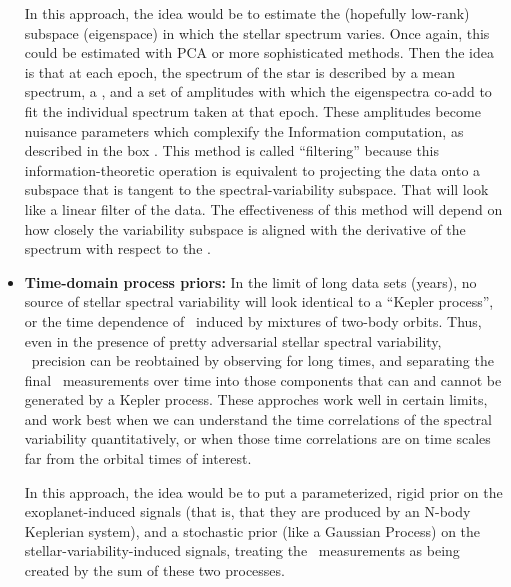 \documentclass[12pt, letterpaper]{article}
\begin{document}
\begin{itemize}
In this approach, the idea would be to estimate the (hopefully
low-rank) subspace (eigenspace) in which the stellar spectrum varies.
Once again, this could be estimated with PCA or more sophisticated
methods.
Then the idea is that at each epoch, the spectrum of the star is
described by a mean spectrum, a \RV, and a set of amplitudes with
which the eigenspectra co-add to fit the individual spectrum taken at
that epoch.
These amplitudes become nuisance parameters which complexify the
Information computation, as described in the box .
This method is called ``filtering'' because this information-theoretic
operation is equivalent to projecting the data onto a subspace that is
tangent to the spectral-variability subspace.
That will look like a linear filter of the data. 
The effectiveness of this method will depend on how closely the variability
subspace is aligned with the derivative of the spectrum with respect to the \RV. 
\item
\textbf{Time-domain process priors:}
In the limit of long data sets (years), no source of stellar spectral
variability will look identical to a ``Kepler process'', or the time
dependence of \RV\ induced by mixtures of two-body orbits.
Thus, even in the presence of pretty adversarial stellar spectral
variability, \EPRV\ precision can be reobtained by observing for long
times, and separating the final \RV\ measurements over time into those
components that can and cannot be generated by a Kepler process.
These approches work well in certain limits, and work best when we can
understand the time correlations of the spectral variability quantitatively,
or when those time correlations are on time scales far from the
orbital times of interest.

In this approach, the idea would be to put a parameterized, rigid
prior on the exoplanet-induced signals (that is, that they are produced
by an N-body Keplerian system), and a stochastic prior (like a Gaussian
Process) on the stellar-variability-induced signals, treating the
\RV\ measurements as being created by the sum of these two
processes.


\end{itemize}
\end{document}
